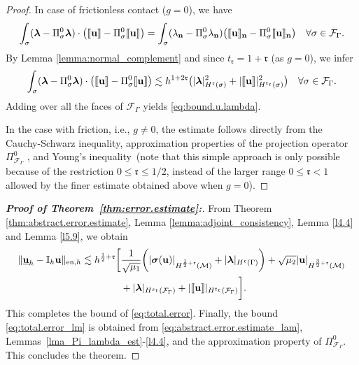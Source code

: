 \documentclass[a4paper,11pt]{article}
\theoremstyle{definition}
\theoremstyle{remark}
\newcommand{\uvec}[1]{\underline{\mathbf{#1}}}
\newcommand{\bo}[1]{\mathbf{#1}}
\newcommand{\bos}[1]{\boldsymbol{#1}}
\newcommand{\mI}[1]{\mathbb I_h\bo{#1}}
\def\cF{\mathcal{F}}
\def\cM{\mathcal{M}}
\def\fr{\mathfrak{r}}
\def\blambda{\boldsymbol{\lambda}}
\def\sjump#1{[\hskip -1.5pt[#1]\hskip -1.5pt]}
\begin{document}
\begin{proof}
In case of frictionless contact ($g=0$), we have
\begin{align*}%
\int_{\sigma}(\blambda-\Pi^0_{{\sigma}}\blambda)\cdot\big( \sjump{\bo{u}}-\Pi^0_{\sigma}\sjump{\bo{u}}\big)=\int_{\sigma}(\lambda_{\bo{n}}-\Pi^0_{\sigma}\lambda_{\bo{n}})\big( \sjump{\bo{u}}_{\bo{n}}-\Pi^0_{\sigma}\sjump{\bo{u}}_{\bo{n}}\big)\quad\forall \sigma\in\cF_\Gamma.
\end{align*}
By Lemma \ref{lemma:normal_complement} and since $t_\fr=1+\fr$ (as $g=0$), we infer
\begin{equation*}
\int_{\sigma}(\blambda-\Pi^0_{\sigma}\blambda)\cdot\big( \sjump{\bo{u}}-\Pi^0_{\sigma}\sjump{\bo{u}}\big)\lesssim h^{1+2\fr}\big(\lvert \blambda\rvert^2_{H^{\fr}(\sigma)}+\lvert \sjump{\bo{u}}\rvert^2_{H^{t_{\fr}}(\sigma)}\big)\quad\forall \sigma\in\cF_\Gamma.
\end{equation*}
Adding over all the faces of $\cF_\Gamma$ yields \eqref{eq:bound.u.lambda}.

In the case with friction, i.e., $g\not=0$, the estimate follows directly from the Cauchy-Schwarz inequality, approximation properties of the projection operator $\Pi^0_{\cF_\Gamma}$ \cite[Theorem 1.45]{hho-book}, and Young's inequality~(note that this simple approach is only possible because of the restriction $0\le\fr\le 1/2$, instead of the larger range $0\le \fr<1$ allowed by the finer estimate obtained above when $g=0$).
\end{proof}

\begin{proof}[\textit{\textbf {Proof of Theorem~\ref{thm:error.estimate}:}}]
From Theorem \ref{thm:abstract.error.estimate}, Lemma \ref{lemma:adjoint_consistency}, Lemma \ref{l4.4} and Lemma \ref{l5.9}, we obtain
\begin{align*}
\lVert\uvec{u}_h-\mI{u}\rVert_{\mathrm{en},h}\lesssim h^{\frac{1}{2}+\fr}\bigg[{}&\frac{1}{\sqrt{\mu_{1}}}\bigg(\lvert\bos{\sigma}(\bo{u})\rvert_{H^{\frac{1}{2}+\fr}(\cM)}+\lvert \blambda\rvert_{H^{\fr}(\Gamma)}\bigg)+\sqrt{\mu_{2}}\lvert\bo{u}\rvert_{H^{\frac{3}{2}+\fr}(\cM)}\\
&+\lvert \blambda\rvert_{H^{s_\fr}(\cF_\Gamma)}+\lvert \sjump{\bo{u}}\rvert_{H^{t_{\fr}}(\cF_\Gamma)}\bigg].
\end{align*}
This completes the bound of \eqref{eq:total.error}. Finally, the  bound \eqref{eq:total.error_lm} is obtained from \eqref{eq:abstract.error.estimate_lam}, Lemmas~\ref{lma_Pi_lambda_est}-\ref{l4.4}, and the approximation property \cite[Theorem 1.45]{hho-book} of $\Pi^0_{\cF_\Gamma}$.
This concludes the theorem.
\end{proof}
\end{document}
